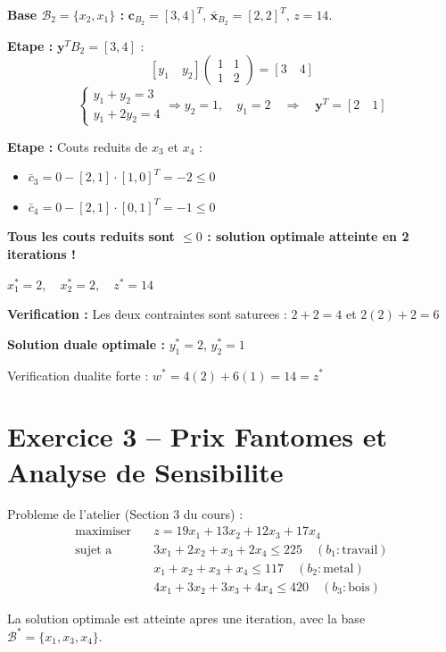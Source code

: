 \documentclass[12pt,a4paper]{article}
\newcommand*\circled[1]{\tikz[baseline=(char.base)]{\node[shape=circle,draw,inner sep=2pt] (char) {#1};}}
\begin{document}
\begin{correction}
\textbf{Base $\mathcal{B}_2 = \{x_2, x_1\}$ :} $\mathbf{c}_{B_2} = [3,4]^T$, $\bar{\mathbf{x}}_{B_2} = [2,2]^T$, $z = 14$.

\textbf{Etape \circled{1} :} $\mathbf{y}^T B_2 = [3,4]$ :
$$[y_1 \quad y_2]\begin{pmatrix}1 & 1\\1 & 2\end{pmatrix} = [3 \quad 4]$$
$$\begin{cases}y_1 + y_2 = 3\\y_1 + 2y_2 = 4\end{cases} \Rightarrow y_2 = 1,\quad y_1 = 2 \quad \Rightarrow \quad \mathbf{y}^T = [2 \quad 1]$$

\textbf{Etape \circled{2} :} Couts reduits de $x_3$ et $x_4$ :
\begin{itemize}
    \item $\bar{c}_3 = 0 - [2,1]\cdot[1,0]^T = -2 \leq 0$ \checkmark
    \item $\bar{c}_4 = 0 - [2,1]\cdot[0,1]^T = -1 \leq 0$ \checkmark
\end{itemize}

\textcolor{defvert}{\Large\textbf{Tous les couts reduits sont $\leq 0$ : solution optimale atteinte en 2 iterations !}}

\begin{center}
\Large $\boxed{x_1^* = 2, \quad x_2^* = 2, \quad z^* = 14}$
\end{center}

\textbf{Verification :} Les deux contraintes sont saturees :
$2 + 2 = 4$ \checkmark \quad et \quad $2(2) + 2 = 6$ \checkmark

\textbf{Solution duale optimale :} $y_1^* = 2$, $y_2^* = 1$

Verification dualite forte : $w^* = 4(2) + 6(1) = 14 = z^*$ \checkmark
\end{correction}

\newpage
\section{Exercice 3 -- Prix Fantomes et Analyse de Sensibilite}

\begin{enonce}
Probleme de l'atelier (Section 3 du cours) :
\begin{align*}
\text{maximiser} \quad & z = 19x_1 + 13x_2 + 12x_3 + 17x_4\\
\text{sujet a} \quad & 3x_1 + 2x_2 + x_3 + 2x_4 \leq 225 \quad (b_1: \text{travail})\\
& x_1 + x_2 + x_3 + x_4 \leq 117 \quad (b_2: \text{metal})\\
& 4x_1 + 3x_2 + 3x_3 + 4x_4 \leq 420 \quad (b_3: \text{bois})
\end{align*}

La solution optimale est atteinte apres une iteration, avec la base $\mathcal{B}^* = \{x_1, x_3, x_4\}$.
\end{enonce}
\end{document}
